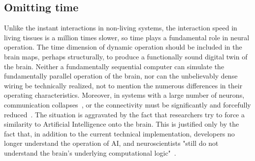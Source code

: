 \subsection*{Omitting time\label{sec:StateTime}}
Unlike the instant interactions in non-living systems, the interaction speed
in living tissues is a million times slower, so time plays a fundamental role in neural operation.
The time dimension of dynamic operation should be included in the brain maps, perhaps structurally, to produce a functionally sound digital twin of the brain.
Neither a fundamentally sequential computer can simulate the fundamentally parallel operation of the brain, nor can the unbelievably dense wiring be technically realized, not to mention the numerous differences in their operating characteristics.  
Moreover, in systems with a large number of neurons, communication collapses~\cite{CommunicationCollapse:2018}, or the connectivity must be significantly and forcefully reduced~\cite{VeghTechnomorphBiology:2025}.
The situation is aggravated by the fact that researchers try to force a similarity to Artificial Intelligence onto the brain.
 This is justified only by the fact that, in addition to the current technical implementation, developers no longer understand the operation of \gls{AI}, and neuroscientists "still do not understand the brain’s underlying computational logic"~\cite{BrainInitiative10:2024}.


